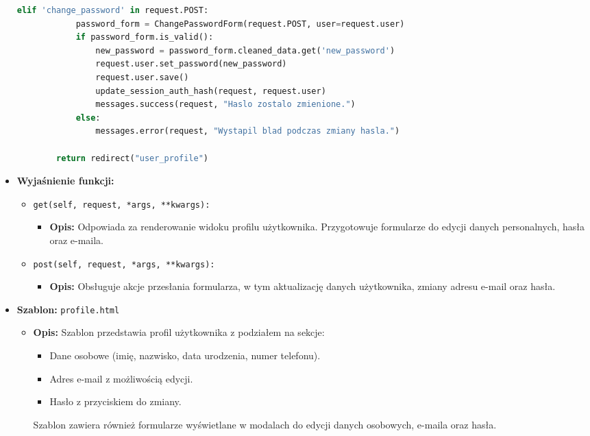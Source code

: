 \documentclass[12pt,a4paper,oneside]{article}
\theoremstyle{definition}
\numberwithin{equation}{section}
\begin{document}
\begin{itemize}
\begin{lstlisting}[language=Python, caption=\texttt{UserProfileView}]
        elif 'change_password' in request.POST:
            password_form = ChangePasswordForm(request.POST, user=request.user)
            if password_form.is_valid():
                new_password = password_form.cleaned_data.get('new_password')
                request.user.set_password(new_password)
                request.user.save()
                update_session_auth_hash(request, request.user)
                messages.success(request, "Haslo zostalo zmienione.")
            else:
                messages.error(request, "Wystapil blad podczas zmiany hasla.")

        return redirect("user_profile")
    \end{lstlisting}

    \item \textbf{Wyjaśnienie funkcji:}
    \begin{itemize}
        \item \texttt{get(self, request, *args, **kwargs):}
        \begin{itemize}
            \item \textbf{Opis:} Odpowiada za renderowanie widoku profilu użytkownika. Przygotowuje formularze do edycji danych personalnych, hasła oraz e-maila.
        \end{itemize}
        \item \texttt{post(self, request, *args, **kwargs):}
        \begin{itemize}
            \item \textbf{Opis:} Obsługuje akcje przesłania formularza, w tym aktualizację danych użytkownika, zmiany adresu e-mail oraz hasła.
        \end{itemize}
    \end{itemize}

    \item \textbf{Szablon:} \texttt{profile.html}
    \begin{itemize}
        \item \textbf{Opis:} Szablon przedstawia profil użytkownika z podziałem na sekcje:
        \begin{itemize}
            \item Dane osobowe (imię, nazwisko, data urodzenia, numer telefonu).
            \item Adres e-mail z możliwością edycji.
            \item Hasło z przyciskiem do zmiany.
        \end{itemize}
        Szablon zawiera również formularze wyświetlane w modalach do edycji danych osobowych, e-maila oraz hasła.
    \end{itemize}
\end{itemize}
\end{document}
